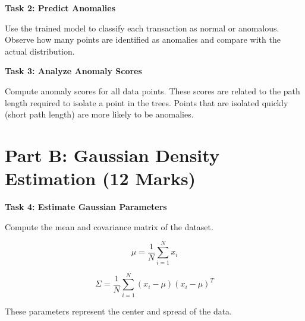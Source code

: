 \documentclass[12pt,a4paper]{article}
\begin{document}
\vspace{6pt}

\begin{tcolorbox}
\textbf{Task 2: Predict Anomalies}

Use the trained model to classify each transaction as normal or anomalous. 
Observe how many points are identified as anomalies and compare with the 
actual distribution.

\vspace{2cm}

\vspace{2cm}
\end{tcolorbox}

\vspace{6pt}

\begin{tcolorbox}
\textbf{Task 3: Analyze Anomaly Scores}

Compute anomaly scores for all data points. These scores are related to 
the path length required to isolate a point in the trees. Points that are 
isolated quickly (short path length) are more likely to be anomalies.

\vspace{2cm}

\vspace{2cm}
\end{tcolorbox}


\section*{Part B: Gaussian Density Estimation (12 Marks)}

\begin{tcolorbox}
\textbf{Task 4: Estimate Gaussian Parameters}

Compute the mean and covariance matrix of the dataset.

\[
\mu = \frac{1}{N} \sum_{i=1}^{N} x_i
\]

\[
\Sigma = \frac{1}{N} \sum_{i=1}^{N} (x_i - \mu)(x_i - \mu)^T
\]

These parameters represent the center and spread of the data.

\vspace{2cm}

\vspace{2cm}
\end{tcolorbox}

\vspace{6pt}
\end{document}
